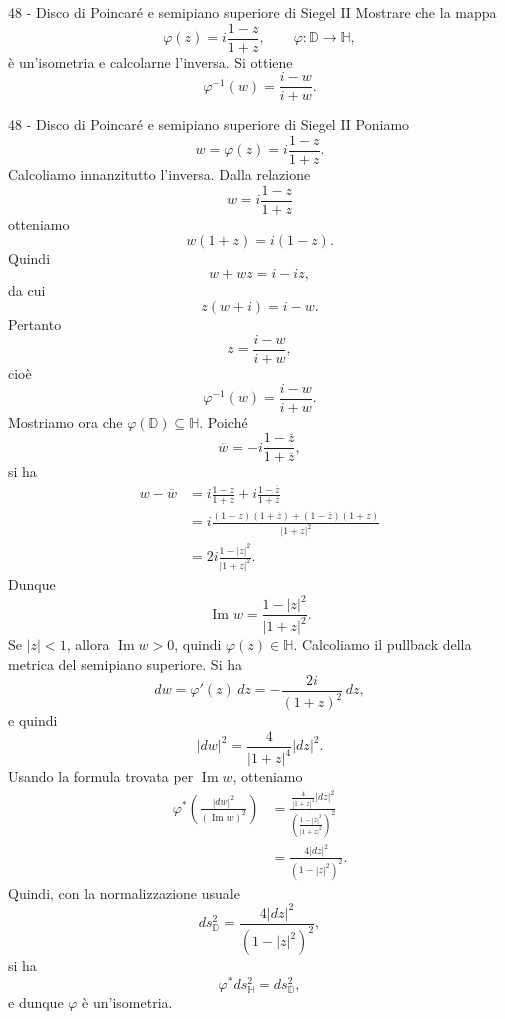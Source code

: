 \documentclass[a4paper]{article}
\begin{document}
\begin{snippetexercise}{48 - Disco di Poincaré e semipiano superiore di Siegel II}
    Mostrare che la mappa
    \[
        \varphi(z)=i\frac{1-z}{1+z},
        \qquad
        \varphi\colon\mathbb{D}\longrightarrow\mathbb{H},
    \]
    è un'isometria e calcolarne l'inversa. Si ottiene
    \[
        \varphi^{-1}(w)=\frac{i-w}{i+w}.
    \]
\end{snippetexercise}

\begin{snippetsolution}{48 - Disco di Poincaré e semipiano superiore di Siegel II}
    Poniamo
    \[
        w=\varphi(z)=i\frac{1-z}{1+z}.
    \]
    Calcoliamo innanzitutto l'inversa. Dalla relazione
    \[
        w=i\frac{1-z}{1+z}
    \]
    otteniamo
    \[
        w(1+z)=i(1-z).
    \]
    Quindi
    \[
        w+wz=i-iz,
    \]
    da cui
    \[
        z(w+i)=i-w.
    \]
    Pertanto
    \[
        z=\frac{i-w}{i+w},
    \]
    cioè
    \[
        \varphi^{-1}(w)=\frac{i-w}{i+w}.
    \]
    Mostriamo ora che \(\varphi(\mathbb{D})\subseteq\mathbb{H}\). Poiché
    \[
        \overline{w}
        =
        -i\frac{1-\overline z}{1+\overline z},
    \]
    si ha
    \begin{align*}
        w-\overline w
        &=
        i\frac{1-z}{1+z}
        +
        i\frac{1-\overline z}{1+\overline z}\\
        &=
        i\frac{(1-z)(1+\overline z)+(1-\overline z)(1+z)}{|1+z|^2}\\
        &=
        2i\frac{1-|z|^2}{|1+z|^2}.
    \end{align*}
    Dunque
    \[
        \operatorname{Im}w
        =
        \frac{1-|z|^2}{|1+z|^2}.
    \]
    Se \(|z|<1\), allora \(\operatorname{Im}w>0\), quindi \(\varphi(z)\in\mathbb{H}\).
    Calcoliamo il pullback della metrica del semipiano superiore. Si ha
    \[
        dw
        =
        \varphi'(z)\,dz
        =
        -\frac{2i}{(1+z)^2}\,dz,
    \]
    e quindi
    \[
        |dw|^2
        =
        \frac{4}{|1+z|^4}|dz|^2.
    \]
    Usando la formula trovata per \(\operatorname{Im}w\), otteniamo
    \begin{align*}
        \varphi^*\left(\frac{|dw|^2}{(\operatorname{Im}w)^2}\right)
        &=
        \frac{\frac{4}{|1+z|^4}|dz|^2}
        {\left(\frac{1-|z|^2}{|1+z|^2}\right)^2}\\
        &=
        \frac{4|dz|^2}{(1-|z|^2)^2}.
    \end{align*}
    Quindi, con la normalizzazione usuale
    \[
        ds^2_{\mathbb{D}}
        =
        \frac{4|dz|^2}{(1-|z|^2)^2},
    \]
    si ha
    \[
        \varphi^*ds^2_{\mathbb{H}}=ds^2_{\mathbb{D}},
    \]
    e dunque \(\varphi\) è un'isometria.
\end{snippetsolution}
\end{document}
